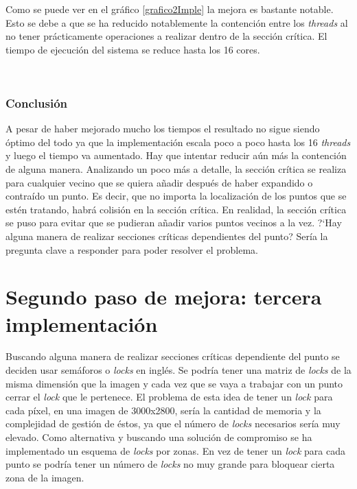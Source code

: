 Como se puede ver en el gr\'{a}fico \ref{grafico2Imple} la mejora es bastante notable. Esto se debe a que se ha reducido notablemente la contenci\'{o}n entre los \textit{threads} al no tener pr\'{a}cticamente operaciones a realizar dentro de la secci\'{o}n cr\'{i}tica. El tiempo de ejecuci\'{o}n del sistema se reduce hasta los 16 cores.

\


\subsubsection{Conclusi\'{o}n}

A pesar de haber mejorado mucho los tiempos el resultado no sigue siendo \'{o}ptimo del todo ya que la implementaci\'{o}n escala poco a poco hasta los 16 \textit{threads} y luego el tiempo va aumentado. Hay que intentar reducir a\'{u}n m\'{a}s la contenci\'{o}n de alguna manera. Analizando un poco m\'{a}s a detalle, la secci\'{o}n cr\'{i}tica se realiza para cualquier vecino que se quiera a\~{n}adir despu\'{e}s de haber expandido o contra\'{i}do un punto. Es decir, que no importa la localizaci\'{o}n de los puntos que se est\'{e}n tratando, habr\'{a} colisi\'{o}n en la secci\'{o}n cr\'{i}tica. En realidad, la secci\'{o}n cr\'{i}tica se puso para evitar que se pudieran a\~{n}adir varios puntos vecinos a la vez. ?`Hay alguna manera de realizar secciones cr\'{i}ticas dependientes del punto? Ser\'{i}a la pregunta clave a responder para poder resolver el problema. 

\section{Segundo paso de mejora: tercera implementaci\'{o}n}

Buscando alguna manera de realizar secciones cr\'{i}ticas dependiente del punto se deciden usar sem\'{a}foros o \textit{locks} en ingl\'{e}s. Se podr\'{i}a tener una matriz de \textit{locks} de la misma dimensi\'{o}n que la imagen y cada vez que se vaya a trabajar con un punto cerrar el \textit{lock} que le pertenece. El problema de esta idea de tener un \textit{lock} para cada p\'{i}xel, en una imagen de 3000x2800, ser\'{i}a la cantidad de memoria y la complejidad de gesti\'{o}n de \'{e}stos, ya que el n\'{u}mero de \textit{locks} necesarios ser\'{i}a muy elevado. Como alternativa y buscando una soluci\'{o}n de compromiso se ha implementado un esquema de \textit{locks} por zonas. En vez de tener un \textit{lock} para cada punto se podr\'{i}a tener un n\'{u}mero de \textit{locks} no muy grande para bloquear cierta zona de la imagen. 


